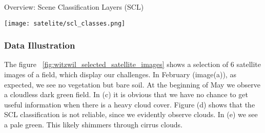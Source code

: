 {{			
			\begin{table}[h]
				\caption{Overview: Scene Classification Layers (SCL)}
				\label{tab:satelite/scl_classes}
				\center
				\texttt{[image: satelite/scl\_classes.png]}
			\end{table}
		}

		\subsubsection*{Data Illustration}{
			
			The figure ~\ref{fig:witzwil_selected_satellite_images} shows a selection of 6 satellite images of a field, which display our challenges. In February (image(a)), as expected, we see no vegetation but bare soil. At the beginning of May we observe a cloudless dark green field. In (c) it is obvious that we have no chance to get useful information when there is a heavy cloud cover. Figure (d) shows that the SCL classification is not reliable, since we evidently observe clouds. In (e) we see a pale green. This likely shimmers through cirrus clouds. 
			
		}
	}

